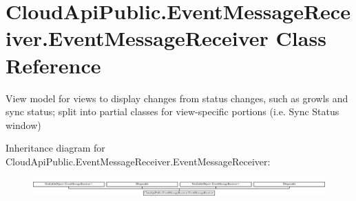 \hypertarget{class_cloud_api_public_1_1_event_message_receiver_1_1_event_message_receiver}{\section{Cloud\-Api\-Public.\-Event\-Message\-Receiver.\-Event\-Message\-Receiver Class Reference}
\label{class_cloud_api_public_1_1_event_message_receiver_1_1_event_message_receiver}
}


View model for views to display changes from status changes, such as growls and sync status; split into partial classes for view-\/specific portions (i.\-e. Sync Status window)  


Inheritance diagram for Cloud\-Api\-Public.\-Event\-Message\-Receiver.\-Event\-Message\-Receiver\-:\begin{figure}[H]
\begin{center}
\leavevmode
\includegraphics[height=0.731071cm]{class_cloud_api_public_1_1_event_message_receiver_1_1_event_message_receiver}
\end{center}
\end{figure}
